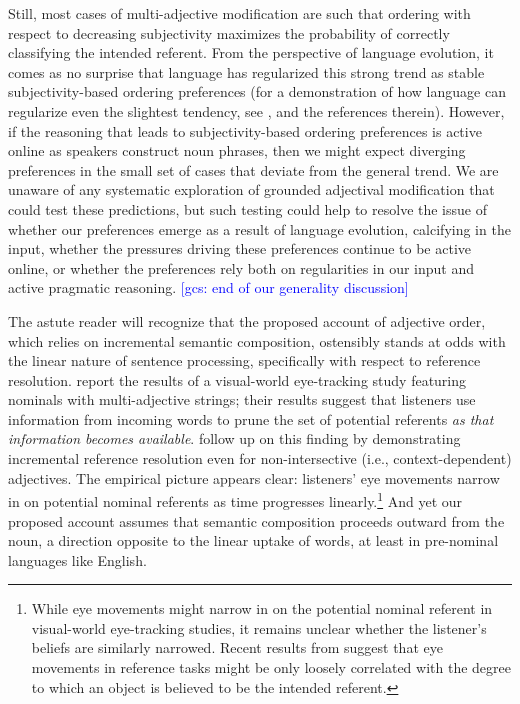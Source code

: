 \documentclass[preprint,authoryear]{elsarticle}\frenchspacing
\newcommand{\jd}[1]{\textcolor{Blue}{[jd: #1]}}
\newcommand{\gcs}[1]{\textcolor{blue}{[gcs: #1]}}
\begin{document}
Still, most cases of multi-adjective modification are such that ordering with respect to decreasing subjectivity maximizes the probability of correctly classifying the intended referent. From the perspective of language evolution, it comes as no surprise that language has regularized this strong trend as stable subjectivity-based ordering preferences (for a demonstration of how language can regularize even the slightest tendency, see \citealp{kirby2017}, and the references therein). However, if the reasoning that leads to subjectivity-based ordering preferences is active online as speakers construct noun phrases, then we might expect diverging preferences in the small set of cases that deviate from the general trend. We are unaware of any systematic exploration of grounded adjectival modification that could test these predictions, but such testing could help to resolve the issue of whether our preferences emerge as a result of language evolution, calcifying in the input, whether the pressures driving these preferences continue to be active online, or whether the preferences rely both on regularities in our input and active pragmatic reasoning.
\gcs{end of our generality discussion}
 

The astute reader will recognize that the proposed account of adjective order, which relies on incremental semantic composition, ostensibly stands at odds with the linear nature of sentence processing, specifically with respect to reference resolution. \cite{eberhardetal1995} report the results of a visual-world eye-tracking study featuring nominals with multi-adjective strings; their results suggest that listeners use information from incoming words to prune the set of potential referents \emph{as that information becomes available}. \cite{sedivyetal1999} follow up on this finding by demonstrating incremental reference resolution even for non-intersective (i.e., context-dependent) adjectives. The empirical picture appears clear: listeners' eye movements narrow in on potential nominal referents as time progresses linearly.\footnote{While eye movements might narrow in on the potential nominal referent in visual-world eye-tracking studies, it remains unclear whether the listener's beliefs are similarly narrowed. Recent results from \cite{qingetal2018} suggest that eye movements in reference tasks might be only loosely correlated with the degree to which an object is believed to be the intended referent. %
} 
And yet our proposed account assumes that semantic composition proceeds outward from the noun, a direction opposite to the linear uptake of words, at least in pre-nominal languages like English.
\end{document}
